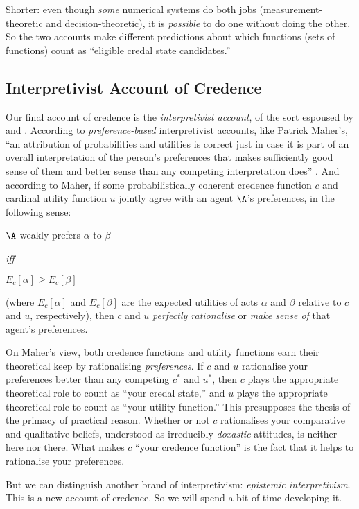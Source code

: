Shorter: even though \textit{some} numerical systems do both jobs (mea\-su\-rement-theoretic and decision-theoretic), it is \textit{possible} to do one without doing the other. So the two accounts make different predictions about which functions (sets of functions) count as ``eligible credal state candidates.''


\subsection{Interpretivist Account of Credence}\label{konek-sec-3-3}

Our final account of credence is the \textit{interpretivist account}, of the sort espoused by \citet{Lewis1974} and \citet{Maher1993}. According to \textit{preference-based} interpretivist accounts, like Patrick Maher's, ``an attribution of probabilities and utilities is correct just in case it is part of an overall interpretation of the person's preferences that makes sufficiently good sense of them and better sense than any competing interpretation does'' \citep[p. 12]{Maher1993}. And according to Maher, if some probabilistically coherent credence function $c$ and cardinal utility function $u$ jointly agree with an agent $\A$'s preferences, in the following sense:
\begin{center}
$\A$ weakly prefers $\alpha$ to $\beta$

\textit{iff}

$E_c[\alpha]\geq E_c[\beta]$
\end{center}
(where $E_c[\alpha]$ and $E_c[\beta]$ are the expected utilities of acts $\alpha$ and $\beta$ relative to $c$ and $u$, respectively), then $c$ and $u$ \textit{perfectly rationalise} or \textit{make sense of} that agent's preferences.

On Maher's view, both credence functions and utility functions earn their theoretical keep by rationalising \textit{preferences}. If $c$ and $u$ rationalise your preferences better than any competing $c^*$ and $u^*$, then $c$ plays the appropriate theoretical role to count as ``your credal state,'' and $u$ plays the appropriate theoretical role to count as ``your utility function.'' This presupposes the thesis of the primacy of practical reason. Whether or not $c$ rationalises your comparative and qualitative beliefs, understood as irreducibly \emph{doxastic} attitudes, is neither here nor there. What makes $c$ ``your credence function'' is the fact that it helps to rationalise your preferences.

But we can distinguish another brand of interpretivism: \textit{epistemic interpretivism}. This is a new account of credence. So we will spend a bit of time developing it.

